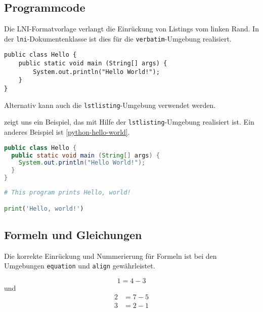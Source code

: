 \documentclass[biblatex]{lni}
\begin{document}
  \subsection{Programmcode}
  Die LNI-Formatvorlage verlangt die Einrückung von Listings vom linken Rand.
  In der \texttt{lni}-Dokumentenklasse ist dies für die \texttt{verbatim}-Umgebung realisiert.

  \begin{verbatim}
public class Hello {
    public static void main (String[] args) {
        System.out.println("Hello World!");
    }
}
  \end{verbatim}

  Alternativ kann auch die \texttt{lstlisting}-Umgebung verwendet werden.

   zeigt uns ein Beispiel, das mit Hilfe der \texttt{lstlisting}-Umgebung realisiert ist. Ein anderes Beispiel ist \cref{python-hello-world}.

  \begin{lstlisting}[caption={Ein Java-Programm}, label=java-hello-world, language=Java]
public class Hello {
  public static void main (String[] args) {
    System.out.println("Hello World!");
  }
}
  \end{lstlisting}

  \begin{lstlisting}[caption={Ein Python-Programm}, label=python-hello-world, language=Python]
# This program prints Hello, world!

print('Hello, world!')
  \end{lstlisting}

  \subsection{Formeln und Gleichungen}

  Die korrekte Einrückung und Nummerierung für Formeln ist bei den Umgebungen
  \texttt{equation} und \texttt{align} gewährleistet.

  \begin{equation}
    1=4-3
  \end{equation}
  und
  \begin{align}
    2&=7-5\\
    3&=2-1
  \end{align}

  \printbibliography
\end{document}
